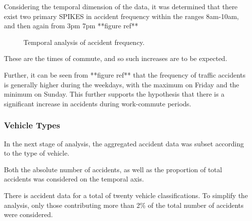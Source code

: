 \documentclass[12pt]{article}
\begin{document}
Considering the temporal dimension of the data, it was determined that there exist two primary SPIKES in accident frequency within the ranges 8am-10am, and then again from 3pm 7pm **figure ref**

\begin{figure}[h]
\centering     %
{}
\caption{Temporal analysis of accident frequency.}
\end{figure}

These are the times of commute, and so such increases are to be expected.

Further, it can be seen from **figure ref** that the frequency of traffic accidents is generally higher during the weekdays, with the maximum on Friday and the minimum on Sunday. This further supports the hypothesis that there is a significant increase in accidents during work-commute periods.

\subsubsection{Vehicle Types}

In the next stage of analysis, the aggregated accident data was subset according to the type of vehicle.

Both the absolute number of accidents, as well as the proportion of total accidents was considered on the temporal axis.

There is accident data for a total of twenty vehicle classifications. To simplify the analysis, only those contributing more than 2\% of the total number of accidents were considered.
\end{document}

